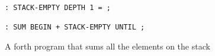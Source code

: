 \begin{figure}[htb]
    \centering
    \begin{lstlisting}[language=Forth]
: STACK-EMPTY DEPTH 1 = ;

: SUM BEGIN + STACK-EMPTY UNTIL ;
\end{lstlisting}
    \caption{A forth program that sums all the elements on the stack}
    \label{fig:forth_example}
\end{figure}
